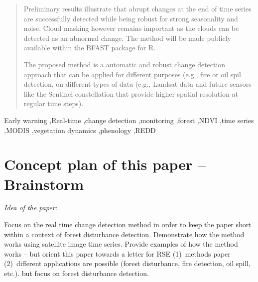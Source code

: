 \documentclass[authoryear,preprint,review,10pt]{elsarticle}
\begin{document}
\begin{frontmatter}
\begin{abstract}

Preliminary results illustrate that abrupt changes at the end of time series are
successfully detected while being robust for strong seasonality and noise. Cloud
masking however remains important as the clouds can be detected as an abnormal
change. The method will be made publicly available within the BFAST package for
R. 

The proposed method is a automatic and robust change detection approach that can
be applied for different purposes (e.g., fire or oil spil detection, on different
types of data  (e.g., Landsat data and future sensors like the Sentinel
constellation that provide higher spatial resolution at regular time steps). 


\end{abstract}

\begin{keyword}
Early warning \sep Real-time \sep change detection \sep monitoring \sep forest \sep NDVI \sep time series \sep MODIS \sep vegetation dynamics \sep phenology \sep REDD
\end{keyword}

\end{frontmatter} 

\newpage


\section{Concept plan of this paper -- Brainstorm}

\emph{Idea of the paper:}

Focus on the real time change detection method in order to keep the paper short
within a context of forest disturbance detection.  Demonstrate how the method
works using satellite image time series.  Provide examples of how the method
works -- but orient this paper towards a letter for RSE (1)~methods paper
(2)~different applications are possible (forest disturbance, fire detection, oil
spill, etc.). but focus on forest disturbance detection.
\end{document}
